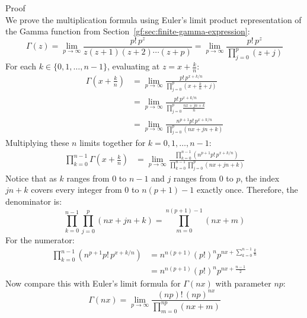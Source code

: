 \documentclass[a4paper]{article}
\begin{document}
\begin{theorem}
        Proof
        \\
        We prove the multiplication formula using Euler's limit product representation of the Gamma function from Section~\ref{gf:sec:finite-gamma-expression}:
        \begin{equation*}
            \Gamma(z) = \lim_{p \to \infty} \frac{p! \, p^z}{z(z+1)(z+2)\cdots(z+p)} = \lim_{p \to \infty} \frac{p! \, p^z}{\prod_{j=0}^p (z+j)}
        \end{equation*}
        For each $k \in \{0, 1, \dots, n-1\}$, evaluating at $z = x + \frac{k}{n}$:
        \begin{align*}
            \Gamma\left(x + \frac{k}{n}\right) & = \lim_{p \to \infty} \frac{p! \, p^{x + k/n}}{\prod_{j=0}^p \left(x + \frac{k}{n} + j\right)} \\
            & = \lim_{p \to \infty} \frac{p! \, p^{x + k/n}}{\prod_{j=0}^p \frac{nx + jn + k}{n}} \\
            & = \lim_{p \to \infty} \frac{n^{p+1} p! \, p^{x + k/n}}{\prod_{j=0}^p (nx + jn + k)}
        \end{align*}
        Multiplying these $n$ limits together for $k = 0, 1, \dots, n-1$:
        \begin{align*}
            \prod_{k=0}^{n-1} \Gamma\left(x + \frac{k}{n}\right) & = \lim_{p \to \infty} \frac{\prod_{k=0}^{n-1} \left( n^{p+1} p! \, p^{x + k/n} \right)}{\prod_{k=0}^{n-1} \prod_{j=0}^p (nx + jn + k)}
        \end{align*}
        Notice that as $k$ ranges from $0$ to $n-1$ and $j$ ranges from $0$ to $p$, the index $jn + k$ covers every integer from $0$ to $n(p+1) - 1$ exactly once.
        Therefore, the denominator is:
        \begin{equation*}
            \prod_{k=0}^{n-1} \prod_{j=0}^p (nx + jn + k) = \prod_{m=0}^{n(p+1)-1} (nx + m)
        \end{equation*}
        For the numerator:
        \begin{align*}
            \prod_{k=0}^{n-1} \left( n^{p+1} p! \, p^{x + k/n} \right) & = n^{n(p+1)} (p!)^n p^{nx + \sum_{k=0}^{n-1} \frac{k}{n}} \\
            & = n^{n(p+1)} (p!)^n p^{nx + \frac{n-1}{2}}
        \end{align*}
        Now compare this with Euler's limit formula for $\Gamma(nx)$ with parameter $np$:
        \begin{equation*}
            \Gamma(nx) = \lim_{p \to \infty} \frac{(np)! \, (np)^{nx}}{\prod_{m=0}^{np} (nx + m)}
        \end{equation*}

\end{theorem}
\end{document}
